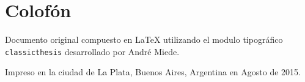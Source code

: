 
\pagestyle{empty}

\hfill

\vfill

\newcommand{\latex}{\LaTeX\xspace}

\section*{Colofón}

\begin{flushleft}
Documento original compuesto en \latex utilizando el modulo tipográfico \texttt{classicthesis} desarrollado por André Miede.

\bigskip

Impreso en la ciudad de La Plata, Buenos Aires, Argentina en Agosto de 2015.
 
\end{flushleft}
\bigskip

